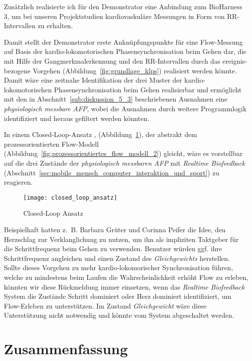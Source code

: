 Zusätzlich realisierte ich für den Demonstrator eine Anbindung zum BioHarness 3, um bei unseren Projektstudien \citep{Grueter2016a} kardiovaskuläre Messungen in Form von RR-Intervallen zu erhalten.

Damit stellt der Demonstrator erste Anknüpfungspunkte für eine Flow-Messung auf Basis der kardio-lokomotorischen Phasensynchronisation beim Gehen dar, die mit Hilfe der Gangmerkmalerkennung und den RR-Intervallen durch das ereignis-bezogene Vorgehen (Abbildung~\ref{fig:grundlage_klps}) realisiert werden könnte. Damit wäre eine zeitnahe Identifikation der drei Muster der kardio-lokomotorischen Phasensynchronisation beim Gehen realisierbar und ermöglicht mit den in Abschnitt~\ref{sub:diskussion_5_3} beschriebenen Ausnahmen eine \emph{physiologisch messbare \ac{AFP}}, wobei die Ausnahmen durch weitere Programmlogik identifiziert und heraus gefiltert werden könnten. 

In einem Closed-Loop-Ansatz \citep[][S.~474]{Calvo2015}, (Abbildung~\ref{fig:closed_loop_ansatz}), der abstrakt dem prozessorientierten Flow-Modell (Abbildung~\ref{fig:prozessorientiertes_flow_modell_2}) gleicht, wäre es vorstellbar auf die drei Zustände der \emph{physiologisch messbaren \ac{AFP}} mit \emph{Realtime Biofeedback} (Abschnitt~\ref{sec:mobile_mensch_computer_interaktion_und_sport}) zu reagieren. 
\begin{figure}
	[!htb] \centering 
	\texttt{[image: closed\_loop\_ansatz]} \caption[Closed-Loop Ansatz]{Closed-Loop Ansatz} \label{fig:closed_loop_ansatz} 
\end{figure}

Beispielhaft hatten z.~B. Barbara Grüter und Corinna Peifer die Idee, den Herzschlag zur Verklanglichung zu nutzen, um ihn als impliziten Taktgeber für die Schrittfrequenz beim Gehen zu verwenden. Benutzer würden ggf. ihre Schrittfrequenz angleichen und einen Zustand des \emph{Gleichgewichts} herstellen. Sollte dieses Vorgehen zu mehr kardio-lokomorischer Synchronisation führen, welche zu mindestens beim Laufen die Wahrscheinlichkeit erhöht Flow zu erleben, könnten wir diese Rückmeldung immer einsetzen, wenn das \emph{Realtime Biofeedback} System die Zustände {Schritt dominiert} oder {Herz dominiert} identifiziert, um Flow-Erleben zu unterstützen. Im Zustand \emph{Gleichgewicht} wäre diese Unterstützung nicht notwendig und könnte vom System abgeschaltet werden. 

\section{Zusammenfassung} 

